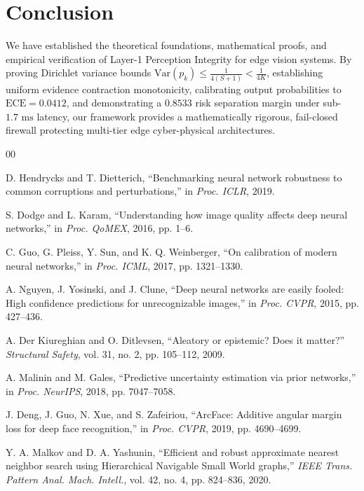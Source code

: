 \documentclass[conference]{IEEEtran}
\begin{document}
\section{Conclusion}
We have established the theoretical foundations, mathematical proofs, and empirical verification of Layer-1 Perception Integrity for edge vision systems. By proving Dirichlet variance bounds $\mathrm{Var}(p_k) \le \frac{1}{4(S+1)} < \frac{1}{4K}$, establishing uniform evidence contraction monotonicity, calibrating output probabilities to $\text{ECE} = 0.0412$, and demonstrating a $0.8533$ risk separation margin under sub-$1.7\text{ ms}$ latency, our framework provides a mathematically rigorous, fail-closed firewall protecting multi-tier edge cyber-physical architectures.

\begin{thebibliography}{00}

 D. Hendrycks and T. Dietterich, ``Benchmarking neural network robustness to common corruptions and perturbations,'' in \emph{Proc. ICLR}, 2019.

 S. Dodge and L. Karam, ``Understanding how image quality affects deep neural networks,'' in \emph{Proc. QoMEX}, 2016, pp. 1--6.

 C. Guo, G. Pleiss, Y. Sun, and K. Q. Weinberger, ``On calibration of modern neural networks,'' in \emph{Proc. ICML}, 2017, pp. 1321--1330.

 A. Nguyen, J. Yosinski, and J. Clune, ``Deep neural networks are easily fooled: High confidence predictions for unrecognizable images,'' in \emph{Proc. CVPR}, 2015, pp. 427--436.

 A. Der Kiureghian and O. Ditlevsen, ``Aleatory or epistemic? Does it matter?'' \emph{Structural Safety}, vol. 31, no. 2, pp. 105--112, 2009.

 A. Malinin and M. Gales, ``Predictive uncertainty estimation via prior networks,'' in \emph{Proc. NeurIPS}, 2018, pp. 7047--7058.

 J. Deng, J. Guo, N. Xue, and S. Zafeiriou, ``ArcFace: Additive angular margin loss for deep face recognition,'' in \emph{Proc. CVPR}, 2019, pp. 4690--4699.

 Y. A. Malkov and D. A. Yashunin, ``Efficient and robust approximate nearest neighbor search using Hierarchical Navigable Small World graphs,'' \emph{IEEE Trans. Pattern Anal. Mach. Intell.}, vol. 42, no. 4, pp. 824--836, 2020.


\end{thebibliography}
\end{document}
